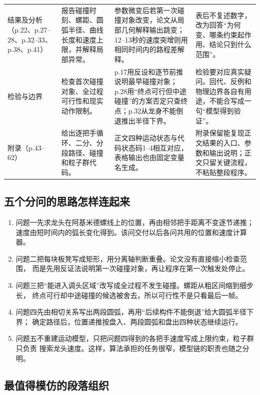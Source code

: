 \documentclass[UTF8,zihao=-4]{ctexart}
\begin{document}
\begin{longtable}{p{2.25cm}p{4.0cm}p{5.1cm}p{4.2cm}}
结果及分析（p.22、p.27--28、p.32--33、p.38、p.41）
& 报告碰撞时刻、螺距、圆弧半径、曲线长度和速度上限，并解释局部异常。
& 参数微变后若第一次碰撞对象改变，论文从局部几何解释输出跳变；12--13秒的速度突增则用相同时间内的路程差解释。
& 表后不复述数字，改为回答“为何变、哪条约束起作用、结论只到什么范围”。\\

检验与边界
& 检查首次碰撞对象、全过程可行性和现实动作限制。
& p.17用反设和逐节前推说明最早碰撞对象；p.28用“终点可行但中途碰撞”的方案否定只查终点；p.32从龙身不能倒退推出半径下界。
& 检验要对应真实疑问。回代、反例和物理边界各自有用途，不能合写成一句“模型得到验证”。\\

附录（p.43--62）
& 给出逐把手循环、二分、分段路径、碰撞和粒子群代码。
& 正文四种运动状态与代码状态码1--4相互对应，表格输出也由固定变量名生成。
& 附录保留能复现正文结果的入口、参数和输出说明；正文只留关键流程，不粘贴整段程序。\\
\end{longtable}
\normalsize

\subsection{五个分问的思路怎样连起来}

\begin{enumerate}
  \item 问题一先求龙头在阿基米德螺线上的位置，再由相邻把手距离不变逐节递推；
  速度由短时间内的弧长变化得到。该问交付以后各问共用的位置和速度计算器。
  \item 问题二把每块板凳写成矩形，用分离轴判断重叠。论文没有直接缩小检查范围，
  而是先用反证法说明第一次碰撞对象，再让程序在第一次触发处停止。
  \item 问题三把“能进入调头区域”改写成全过程不发生碰撞。螺距从粗区间缩到细步长，
  终点可行却中途碰撞的候选被舍去，所以可行性不是只看最后一帧。
  \item 问题四先由相切关系写出两段圆弧，再用“后续构件不能倒退”给大圆弧半径下界；
  确定路径后，位置递推按盘入、两段圆弧和盘出四种状态继续运行。
  \item 问题五不重建运动模型，只把问题四得到的各把手速度写成上限约束，粒子群只负责
  搜索龙头速度。这样，算法承担的任务很窄，模型链的职责也随之分明。
\end{enumerate}

\subsection{最值得模仿的段落组织}
\end{document}
